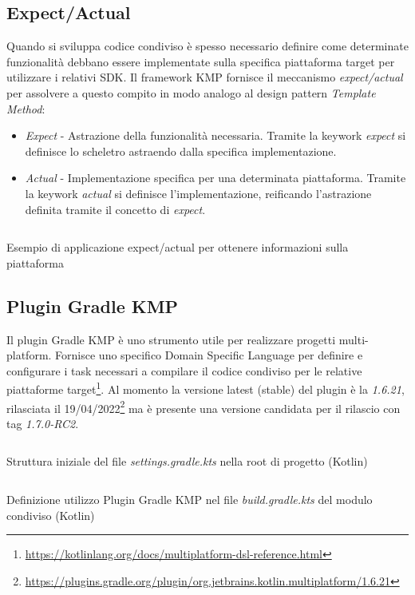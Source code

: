 \subsection{Expect/Actual}
Quando si sviluppa codice condiviso è spesso necessario definire come determinate funzionalità debbano essere implementate sulla specifica piattaforma target per utilizzare i relativi SDK. Il framework KMP fornisce il meccanismo \textit{expect/actual} per assolvere a questo compito in modo analogo al design pattern \textit{Template Method}:
\begin{itemize}
    \item \textit{Expect} - Astrazione della funzionalità necessaria. Tramite la keywork \textit{expect} si definisce lo scheletro astraendo dalla specifica implementazione.
    \item \textit{Actual} - Implementazione specifica per una determinata piattaforma. Tramite la keywork \textit{actual} si definisce l'implementazione, reificando l'astrazione definita tramite il concetto di \textit{expect}.
\end{itemize}

\begin{listing}[H]
\inputminted{kotlin}{code/3-expectactual}
\caption{Esempio di applicazione expect/actual per ottenere informazioni sulla piattaforma}
\end{listing}

\subsection{Plugin Gradle KMP}
Il plugin Gradle KMP è uno strumento utile per realizzare progetti multi-platform. Fornisce uno specifico Domain Specific Language per definire e configurare i task necessari a compilare il codice condiviso per le relative piattaforme target\footnote{\url{https://kotlinlang.org/docs/multiplatform-dsl-reference.html}}. Al momento la versione latest (stable) del plugin è la \textit{1.6.21}, rilasciata il 19/04/2022\footnote{\url{https://plugins.gradle.org/plugin/org.jetbrains.kotlin.multiplatform/1.6.21}} ma è presente una versione candidata per il rilascio con tag \textit{1.7.0-RC2}.

\begin{listing}[H]
\inputminted{kotlin}{code/3-gradlekmm1}
\caption{Struttura iniziale del file \textit{settings.gradle.kts} nella root di progetto (Kotlin)}
\end{listing}

\begin{listing}[H]
\inputminted{kotlin}{code/3-gradlekmm2}
\caption{Definizione utilizzo Plugin Gradle KMP nel file \textit{build.gradle.kts} del modulo condiviso (Kotlin)}
\end{listing}

